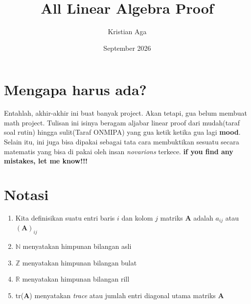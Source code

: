 \documentclass[a4paper, 12pt]{article}
\title{All Linear Algebra Proof}
\author{Kristian Aga}
\date{September 2026}
\begin{document}
\maketitle

\section{Mengapa harus ada?}
Entahlah, akhir-akhir ini buat banyak project. Akan tetapi, gua belum membuat math project. Tulisan ini isinya beragam aljabar linear proof dari mudah(taraf soal rutin) hingga sulit(Taraf ONMIPA) yang gua ketik ketika gua lagi \textbf{mood}. Selain itu, ini juga bisa dipakai sebagai tata cara membuktikan sesuatu secara matematis yang bisa di pakai oleh insan \textit{novarions} terkece. \textbf{if you find any mistakes, let me know!!!}

\section{Notasi}
\begin{enumerate}
    \item Kita definisikan suatu entri baris $i$ dan kolom $j$ matriks $\mathbf{A}$ adalah $a_{ij} $ atau $(\mathbf{A})_{ij}$
    \item $\mathbb{N}$ menyatakan himpunan bilangan asli
    \item $\mathbb{Z}$ menyatakan himpunan bilangan bulat
    \item $\mathbb{R}$ menyatakan himpunan bilangan rill
    \item tr($\mathbf{A}$)  menyatakan \textit{trace} atau jumlah entri diagonal utama matriks $\mathbf A$
\end{enumerate}
\end{document}
